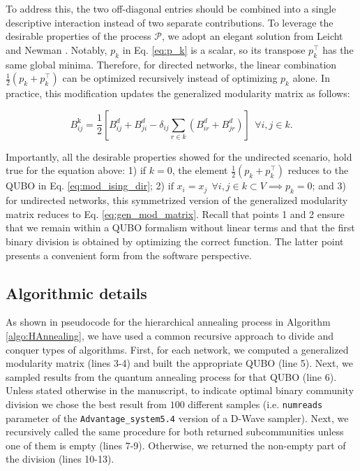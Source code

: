 \documentclass[pdflatex,sn-mathphys-num]{sn-jnl}%
\begin{document}
To address this, the two off-diagonal entries should be combined into a single descriptive interaction instead of two separate contributions. To leverage the desirable properties of the process \(\mathcal{P}\), we adopt an elegant solution from Leicht and Newman \cite{Leicht2008}. Notably, \(p_k\) in Eq. \ref{eq:p_k} is a scalar, so its transpose \(p_k^\top\) has the same global minima. Therefore, for directed networks, the linear combination \(\frac{1}{2} \left( p_k + p_k^\top \right)\) can be optimized recursively instead of optimizing \(p_k\) alone. In practice, this modification updates the generalized modularity matrix as follows:

\begin{equation} \label{eq:symmetrized_B_elements}
    B_{ij}^{\text{k}} = \frac{1}{2} \left[ B_{ij}^{d} + B_{ji}^{d} - \delta_{ij} \sum_{r \in k} \left( B_{ir}^{d} + B_{jr}^{d} \right) \right] \ \ \forall i,j \in k. 
\end{equation}

Importantly, all the desirable properties showed for the undirected scenario, hold true for the equation above: 1) if $k=0$, the element \(\frac{1}{2} \left( p_k + p_k^\top \right)\) reduces to the QUBO in Eq. \ref{eq:mod_ising_dir}; 2) $\text{if } x_i=x_j \ \ \forall i,j \in k \subset V \implies p_k = 0$; and 3) for undirected networks, this symmetrized version of the generalized modularity matrix reduces to Eq. \ref{eq:gen_mod_matrix}. Recall that points 1 and 2 ensure that we remain within a QUBO formalism without linear terms and that the first binary division is obtained by optimizing the correct function. The latter point presents a convenient form from the software perspective.

\subsection*{Algorithmic details}

As shown in pseudocode for the hierarchical annealing process in Algorithm \ref{algo:HAnnealing}, we have used a common recursive approach to divide and conquer types of algorithms. First, for each network, we computed a generalized modularity matrix (lines 3-4)  and built the appropriate QUBO (line 5). Next, we sampled results from the quantum annealing process for that QUBO (line 6). Unless stated otherwise in the manuscript, to indicate optimal binary community division we chose the best result from $100$ different samples (i.e. {\tt numreads} parameter of the {\tt Advantage\_system5.4} version of a D-Wave sampler). Next, we recursively called the same procedure for both returned subcommunities unless one of them is empty (lines 7-9). Otherwise, we returned the non-empty part of the division (lines 10-13). 
\end{document}
